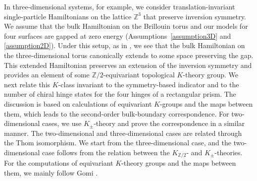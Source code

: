 \documentclass{amsart}
\theoremstyle{plain}
\theoremstyle{definition}
\theoremstyle{remark}
\newcommand{\Z}{\mathbb{Z}}
\begin{document}
In three-dimensional systems, for example, we consider translation-invariant single-particle Hamiltonians on the lattice $\Z^3$ that preserve inversion symmetry.
We assume that the bulk Hamiltonian on the Brillouin torus and our models for four surfaces are gapped at zero energy (Assumptions~\ref{assumption3D} and \ref{assumption2D}).
Under this setup, as in \cite{Hayashi5}, we see that the bulk Hamiltonian on the three-dimensional torus canonically extends to some space preserving the gap.
This extended Hamiltonian preserves an extension of the inversion symmetry and provides an element of some $\Z/2$-equivariant topological $K$-theory group.
We next relate this $K$-class invariant to the symmetry-based indicator and to the number of chiral hinge states for the four hinges of a rectangular prism.
The discussion is based on calculations of equivariant $K$-groups and the maps between them, which leads to the second-order bulk-boundary correspondence.
For two-dimensional cases, we use $K_\pm$-theory \cite{Witten98,AH04} and prove the correspondence in a similar manner.
The two-dimensional and three-dimensional cases are related through the Thom isomorphism.
We start from the three-dimensional case, and the two-dimensional case follows from the relation between the $K_{\Z/2}$- and $K_\pm$-theories.
For the computations of equivariant $K$-theory groups and the maps between them, we mainly follow Gomi \cite{Gomi15}.
\end{document}
